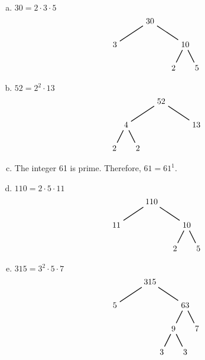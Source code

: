 \documentclass[11pt,letterpaper]{article}
\begin{document}
\sol 
\begin{enumerate}[(a)]
\item $30= 2 \cdot 3 \cdot 5$
	\[
	\begin{tikzpicture}
	\node at (0,0) (n) {30};
	\node at (-1.5,-1) (a) {3};
	\node at (1.5,-1) (b) {10};
	\node at (1,-2) (e) {2};
	\node at (2,-2) (f) {5};
	
	\draw[line width=0.03cm] (n) -- (a);
	\draw[line width=0.03cm] (n) -- (b);
	\draw[line width=0.03cm] (b) -- (e);
	\draw[line width=0.03cm] (b) -- (f);
	\end{tikzpicture}
	\]

\item $52= 2^2 \cdot 13$
	\[
	\begin{tikzpicture}
	\node at (0,0) (n) {52};
	\node at (-1.5,-1) (a) {4};
	\node at (1.5,-1) (b) {13};
	\node at (-2,-2) (c) {2};
	\node at (-1,-2) (d) {2};
	
	\draw[line width=0.03cm] (n) -- (a);
	\draw[line width=0.03cm] (n) -- (b);
	\draw[line width=0.03cm] (a) -- (c);
	\draw[line width=0.03cm] (a) -- (d);
	\end{tikzpicture}
	\] \pspace

\item The integer 61 is prime. Therefore, $61= 61^1$. \pspace

\item $110= 2 \cdot 5 \cdot 11$
	\[
	\begin{tikzpicture}
	\node at (0,0) (n) {110};
	\node at (-1.5,-1) (a) {11};
	\node at (1.5,-1) (b) {10};
	\node at (1,-2) (e) {2};
	\node at (2,-2) (f) {5};
	
	\draw[line width=0.03cm] (n) -- (a);
	\draw[line width=0.03cm] (n) -- (b);
	\draw[line width=0.03cm] (b) -- (e);
	\draw[line width=0.03cm] (b) -- (f);
	\end{tikzpicture}
	\]

\item $315= 3^2 \cdot 5 \cdot 7$
	\[
	\begin{tikzpicture}
	\node at (0,0) (n) {315};
	\node at (-1.5,-1) (a) {5};
	\node at (1.5,-1) (b) {63};
	\node at (1,-2) (e) {9};
	\node at (2,-2) (f) {7};
	\node at (0.5,-3) (g) {3};
	\node at (1.5,-3) (h) {3};
	
	\draw[line width=0.03cm] (n) -- (a);
	\draw[line width=0.03cm] (n) -- (b);
	\draw[line width=0.03cm] (b) -- (e);
	\draw[line width=0.03cm] (b) -- (f);
	\draw[line width=0.03cm] (e) -- (g);
	\draw[line width=0.03cm] (e) -- (h);
	\end{tikzpicture}
	\]
\end{enumerate}
\end{document}

